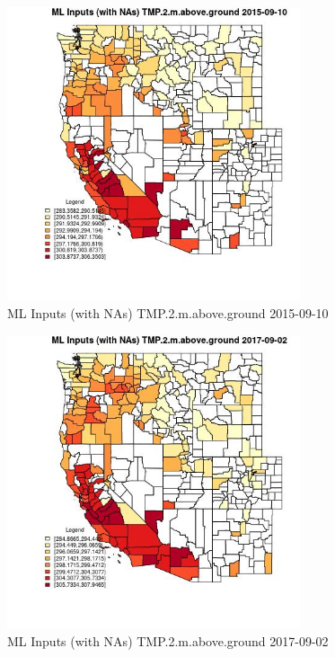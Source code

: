 \begin{figure} 
\centering  
\includegraphics[width=0.77\textwidth]{Code_Outputs/Report_ML_input_PM25_Step4_part_e_de_duplicated_aves_compiled_2019-05-20wNAs_CountyTMP2mabovegroundMean2015-09-10.jpg} 
\caption{\label{fig:Report_ML_input_PM25_Step4_part_e_de_duplicated_aves_compiled_2019-05-20wNAsCountyTMP2mabovegroundMean2015-09-10}ML Inputs (with NAs) TMP.2.m.above.ground 2015-09-10} 
\end{figure} 
 

\begin{figure} 
\centering  
\includegraphics[width=0.77\textwidth]{Code_Outputs/Report_ML_input_PM25_Step4_part_e_de_duplicated_aves_compiled_2019-05-20wNAs_CountyTMP2mabovegroundMean2017-09-02.jpg} 
\caption{\label{fig:Report_ML_input_PM25_Step4_part_e_de_duplicated_aves_compiled_2019-05-20wNAsCountyTMP2mabovegroundMean2017-09-02}ML Inputs (with NAs) TMP.2.m.above.ground 2017-09-02} 
\end{figure} 
 

